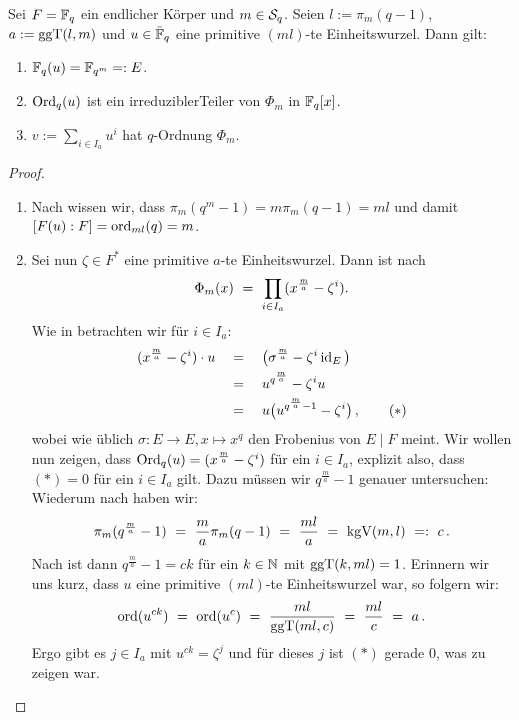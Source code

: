 \begin{satz}
  \label{satz:konstruktion_q_ordnung}
  Sei $F = \F_q$ ein endlicher Körper und $m \in \S_q$. Seien
  $l := \pi_m(q-1)$, $a := \ggT(l,m)$ und $u \in \bar\F_q$ eine primitive
  $(ml)$-te Einheitswurzel. Dann gilt:
  \begin{enumerate}
    \item $\F_q(u) = \F_{q^m} =: E$.
    \item $\Ord_q(u)$ ist ein irreduziblerTeiler von $\Phi_m$ in $\F_q[x]$.
    \item $v := \sum_{i \in I_a} u^i$ hat $q$-Ordnung $\Phi_m$.
  \end{enumerate}
\end{satz}
\begin{proof}
  \begin{enumerate}
  \item Nach  wissen wir, dass 
   $\pi_m(q^m-1) = m\pi_m(q-1) = ml$ und
    damit $[F(u):F] = \ord_{ml}(q) = m$. 
  \item Sei nun $\zeta \in F^\ast$ eine primitive $a$-te Einheitswurzel. Dann
    ist nach \TODO
    \[ \Phi_m(x) \speq= \prod_{i\in I_a} (x^{\frac m a} - \zeta^i).\]
    Wie in  betrachten wir für $i \in I_a$:
    \begin{align*}
      (x^{\frac m a} - \zeta^i)\cdot u 
      \quad&=\quad \big( \sigma^{\frac m a} - \zeta^i \id_E \big)\\
        &=\quad u^{q^{\frac m a}} - \zeta^i u \\
        &=\quad u\big( u^{q^{\frac m a}-1} - \zeta^i \big)\,, \tag{$\ast$}
    \end{align*}
    wobei wie üblich $\sigma: E \to E, x \mapsto x^q$ den Frobenius von
    $E\mid F$ meint. Wir wollen nun zeigen, dass $\Ord_q(u) = (x^{\frac m a} -
    \zeta^i)$ für ein $i\in I_a$, explizit also, dass $(\ast) = 0$ für ein
    $i\in I_a$ gilt. Dazu müssen wir $q^{\frac m a} -1$ genauer untersuchen:
    Wiederum nach  haben wir:
    \[ \pi_m(q^{\frac m a} -1 ) \speq= \frac m a \pi_m(q-1) \speq=
      \frac{ml}{a} \speq= \kgV(m,l) \speq{=:} c\,.\]
    Nach  ist dann $q^{\frac m a}-1 = ck$ für 
    ein $k\in\N$ mit $\ggT(k,ml) = 1$. Erinnern wir uns kurz, dass $u$ eine
    primitive $(ml)$-te Einheitswurzel war, so folgern wir:
    \[ \ord(u^{ck}) \speq= \ord(u^c) \speq= \frac{ml}{\ggT(ml,c)}
      \speq= \frac{ml}{c} \speq= a\,.\]
    Ergo gibt es $j\in I_a$ mit $u^{ck} = \zeta^j$ und für dieses $j$ ist
    $(\ast)$ gerade $0$, was zu zeigen war.

\end{enumerate}
\end{proof}
